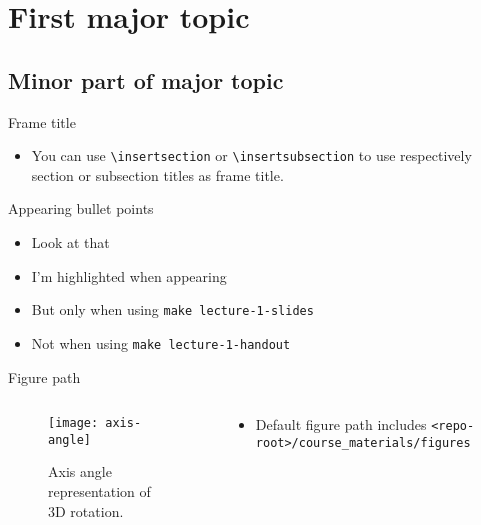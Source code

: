 
\section{First major topic}

  \subsection{Minor part of major topic}

    \begin{frame}{Frame title}
      \begin{itemize}
        \item You can use \texttt{\textbackslash insertsection} or \texttt{\textbackslash insertsubsection} to use respectively section or subsection titles as frame title.
      \end{itemize}
    \end{frame}

    \begin{frame}{Appearing bullet points}
      \begin{itemize}[<+- | alert@+>]
        \item Look at that
        \item I'm highlighted when appearing
        \item But only when using \texttt{make lecture-1-slides}
        \item Not when using \texttt{make lecture-1-handout}
      \end{itemize}
    \end{frame}

    \begin{frame}{Figure path}

      \begin{columns}
        \begin{column}{0.5\linewidth}
          \begin{figure}
            \texttt{[image: axis-angle]}
            \caption{Axis angle representation of 3D rotation.}
          \end{figure}
        \end{column}
        \begin{column}{0.5\linewidth}
          \begin{itemize}
            \item Default figure path includes \texttt{<repo-root>/course\_materials/figures}
          \end{itemize}
        \end{column}
      \end{columns}
      
    \end{frame}

